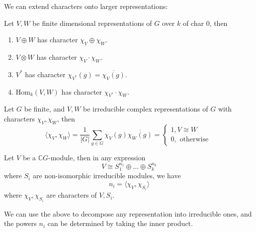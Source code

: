 \documentclass[openany]{book}
\newcommand{\C}{\mathbb{C}}
\newcommand{\la}{\langle}
\newcommand{\ra}{\rangle}
\begin{document}
We can extend characters onto larger representations:
\begin{prop}
    Let $V,W$ be finite dimensional representations of $G$ over $k$ of char $0$, then 
    \begin{enumerate}
        \item $V\oplus W$ has character $\chi_V\oplus\chi_W$.
        \item $V\otimes W$ has character $\chi_V\cdot\chi_W$.
        \item $V^*$ has character $\chi_{V^*}(g)=\overline{\chi_V(g)}$.
        \item $\text{Hom}_k(V,W)$ has character $\chi_{V^*}\cdot\chi_W$.
    \end{enumerate}
\end{prop}


\begin{prop}
    Let $G$ be finite, and $V,W$ be irreducible complex representations of $G$ with characters $\chi_V,\chi_W$, then 
    \begin{equation*}
        \la \chi_V,\chi_W\ra=\frac{1}{|G|}\sum_{g\in G}\chi_V(g)\overline{\chi_W(g)}=\begin{cases}
            1, V\cong W\\
            0, \text{ otherwise }
        \end{cases}
    \end{equation*}
\end{prop}

\begin{prop}
    Let $V$ be a $\C G$-module, then in any expression 
    \begin{equation*}
        V\cong S_1^{n_1}\oplus\dots\oplus S_k^{n_k}
    \end{equation*}
    where $S_i$ are non-isomorphic irreducible modules, we have 
    \begin{equation*}
        n_i=\la \chi_V,\chi_{S_i}\ra
    \end{equation*}
    where $\chi_V,\chi_{S_i}$ are characters of $V,S_i$. 
\end{prop}
\begin{warn}
    We can use the above to decompose any representation into irreducible ones, and the powers $n_i$ can be determined by taking the inner product.
\end{warn}
\end{document}
